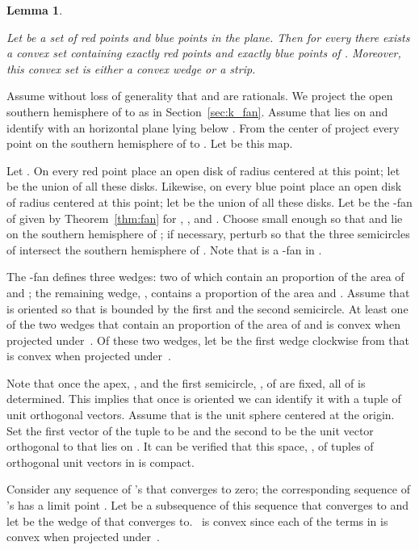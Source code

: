 \documentclass{article}
\newtheorem{lemma}[theorem]{Lemma}
\def\QED{\ensuremath{{\square}}}
\def\markatright#1{\leavevmode\unskip\nobreak\quad\hspace*{\fill}{#1}}
\newenvironment{proof}
  {\begin{trivlist}\item[\hskip\labelsep{\bf Proof.}]}
  {\markatright{\QED}\end{trivlist}}
\begin{document}
\begin{lemma}\label{lem:gen} 

Let  be a set of  red points and  blue points
in the plane. Then for every 
there exists a convex set containing exactly  red points
and exactly  blue points of . Moreover, this convex
set is either a convex wedge or a strip.
\end{lemma}
\begin{proof}

Assume without loss of generality that  and  are rationals.
We project the open southern hemisphere of  to  
as in Section~\ref{sec:k_fan}. Assume that  lies on  and identify
 with an horizontal plane lying below . 
From the center of  project every point on the southern
hemisphere of  to . Let  be this map.

Let .
On every red point 
place an open disk of radius  centered at this point; 
let  be the union of all these disks. Likewise, 
on every blue point  place an open disk of radius  centered at this point; 
let  be the union of all these disks. 
Let  be the -fan of  given by 
Theorem~\ref{thm:fan} for , ,  and 
. Choose  small enough so that   and  lie on the southern hemisphere of ;
if necessary, perturb  so that the three semicircles
of  intersect the southern hemisphere of . Note that 
is a -fan in . 

The -fan  defines three wedges: two of which contain
an  proportion of the area of  and ; the remaining wedge, ,
contains a  proportion of the area  and . Assume that 
 is oriented so that  is bounded
 by the first and the second semicircle. At least one of the two wedges that contain
an  proportion of the area of  and  is convex when projected
under~. Of these two wedges, let  be the first wedge clockwise from  that is convex
when projected under~.

Note that once the apex, , and the first semicircle, , 
of  are fixed, all of  is determined.
This implies that once  is oriented we can identify 
it with a tuple of unit orthogonal vectors. 
Assume that  is the 
unit sphere centered at the origin. Set the first vector
of the tuple to be  and the second to be the unit vector orthogonal 
to  that lies on . It can be verified that this space, , 
of tuples of orthogonal unit vectors in  is compact.  

Consider any sequence of 's that converges to zero; the corresponding
sequence of 's has a limit point  .
Let   be a subsequence of this sequence that converges
to  and let  be the wedge
of  that  converges to. ~is convex  since
each of the terms in  is convex when projected
under~. 


\end{proof}
\end{document}
